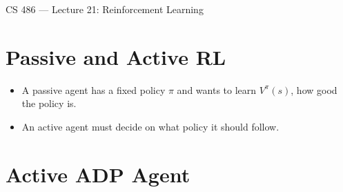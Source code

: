 \documentclass{article}
\author{Clement Tsang}
\begin{document}
\begin{center}
    \Large{CS 486 --- Lecture 21: Reinforcement Learning}
\end{center}

\section{Passive and Active RL}
\begin{itemize}
    \item A passive agent has a fixed policy $\pi$ and wants to learn $ V^\pi(s)$, how good the policy is.
    \item An active agent must decide on what policy it should follow.
\end{itemize}

\section{Active ADP Agent}
\end{document}

